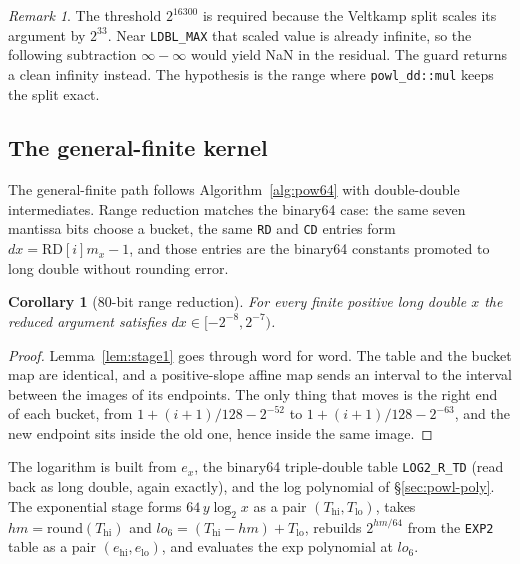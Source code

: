 \documentclass[11pt]{article}
\theoremstyle{plain}
\newtheorem{corollary}{Corollary}
\theoremstyle{remark}
\newtheorem{remark}{Remark}
\begin{document}
\begin{remark}
The threshold $2^{16300}$ is required because the Veltkamp split scales its
argument by $2^{33}$.  Near \texttt{LDBL\_MAX} that scaled value is already
infinite, so the following subtraction $\infty - \infty$ would yield NaN in the
residual.  The guard returns a clean infinity instead.  The hypothesis is the
range where \texttt{powl\_dd::mul} keeps the split exact.
\end{remark}

\subsection{The general-finite kernel}
\label{sec:powl-gen}

The general-finite path follows Algorithm~\ref{alg:pow64} with double-double
intermediates.  Range reduction matches the binary64 case: the same seven
mantissa bits choose a bucket, the same \texttt{RD} and \texttt{CD} entries form
$dx = \mathrm{RD}[i] m_x - 1$, and those entries are the binary64 constants
promoted to long double without rounding error.

\begin{corollary}[80-bit range reduction]
\label{cor:ld-reduction}
For every finite positive long double $x$ the reduced argument satisfies
$dx \in [-2^{-8}, 2^{-7})$.
\end{corollary}

\begin{proof}
Lemma~\ref{lem:stage1} goes through word for word.  The table and the bucket map
are identical, and a positive-slope affine map sends an interval to the interval
between the images of its endpoints.  The only thing that moves is the right end
of each bucket, from $1 + (i+1)/128 - 2^{-52}$ to $1 + (i+1)/128 - 2^{-63}$, and
the new endpoint sits inside the old one, hence inside the same image.
\end{proof}

The logarithm is built from $e_x$, the binary64 triple-double table
\texttt{LOG2\_R\_TD} (read back as long double, again exactly), and the log
polynomial of \S\ref{sec:powl-poly}.  The exponential stage forms
$64\,y\log_2 x$ as a pair $(T_{\mathrm{hi}}, T_{\mathrm{lo}})$, takes
$hm = \mathrm{round}(T_{\mathrm{hi}})$ and
$lo_6 = (T_{\mathrm{hi}} - hm) + T_{\mathrm{lo}}$, rebuilds $2^{hm/64}$ from the
\texttt{EXP2} table as a pair $(e_{\mathrm{hi}}, e_{\mathrm{lo}})$, and evaluates
the exp polynomial at $lo_6$.
\end{document}
